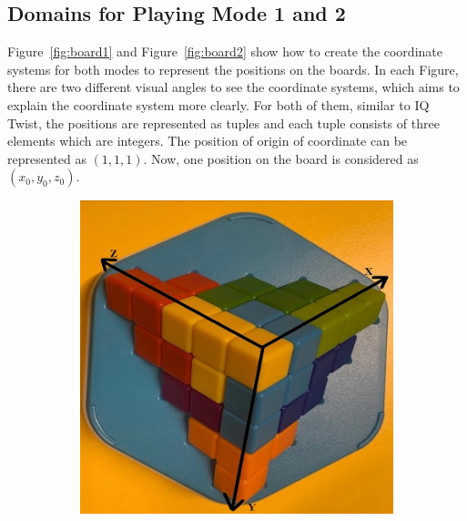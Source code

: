 \subsection{Domains for Playing Mode 1 and 2}
\label{sec:3Ddomains}
Figure~\ref{fig:board1} and Figure~\ref{fig:board2} show how to create the coordinate systems for both modes to represent the positions on the boards. In each Figure, there are two different visual angles to see the coordinate systems, which aims to explain the coordinate system more clearly. For both of them, similar to IQ Twist, the positions are represented as tuples and each tuple consists of three elements which are integers. The position of origin of coordinate can be represented as $(1,1,1)$. Now, one position on the board is considered as $(x_{0},y_{0},z_{0})$.
\begin{figure}[htbp]
\centering
\begin{subfigure}[b]{.45\textwidth}
\centering
\includegraphics[width=\textwidth]{figs/ZIGZAGmodel1board.jpg}
\caption{}
\label{figure:mode1A}
\end{subfigure}
\begin{subfigure}[b]{.45\textwidth}
\centering

\end{subfigure}
\end{figure}
